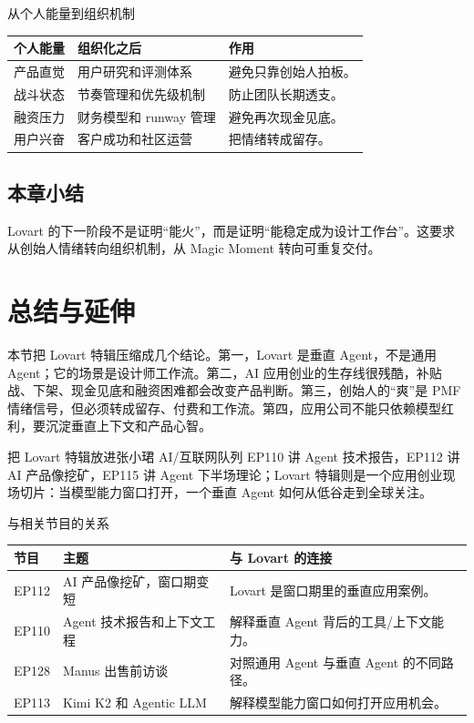 \documentclass[a4paper]{article}
\begin{document}
\begin{knowledgebox}{从个人能量到组织机制}
\begin{tabularx}{\textwidth}{p{}p{}X}
\toprule
个人能量 & 组织化之后 & 作用 \\
\midrule
产品直觉 & 用户研究和评测体系 & 避免只靠创始人拍板。 \\
战斗状态 & 节奏管理和优先级机制 & 防止团队长期透支。 \\
融资压力 & 财务模型和 runway 管理 & 避免再次现金见底。 \\
用户兴奋 & 客户成功和社区运营 & 把情绪转成留存。 \\
\bottomrule
\end{tabularx}
\end{knowledgebox}

\subsection{本章小结}

Lovart 的下一阶段不是证明“能火”，而是证明“能稳定成为设计工作台”。这要求从创始人情绪转向组织机制，从 Magic Moment 转向可重复交付。

\section{总结与延伸}

本节把 Lovart 特辑压缩成几个结论。第一，Lovart 是垂直 Agent，不是通用 Agent；它的场景是设计师工作流。第二，AI 应用创业的生存线很残酷，补贴战、下架、现金见底和融资困难都会改变产品判断。第三，创始人的“爽”是 PMF 情绪信号，但必须转成留存、付费和工作流。第四，应用公司不能只依赖模型红利，要沉淀垂直上下文和产品心智。

\begin{importantbox}{把 Lovart 特辑放进张小珺 AI/互联网队列}
EP110 讲 Agent 技术报告，EP112 讲 AI 产品像挖矿，EP115 讲 Agent 下半场理论；Lovart 特辑则是一个应用创业现场切片：当模型能力窗口打开，一个垂直 Agent 如何从低谷走到全球关注。
\end{importantbox}

\begin{knowledgebox}{与相关节目的关系}
\begin{tabularx}{\textwidth}{p{}p{}X}
\toprule
节目 & 主题 & 与 Lovart 的连接 \\
\midrule
EP112 & AI 产品像挖矿，窗口期变短 & Lovart 是窗口期里的垂直应用案例。 \\
EP110 & Agent 技术报告和上下文工程 & 解释垂直 Agent 背后的工具/上下文能力。 \\
EP128 & Manus 出售前访谈 & 对照通用 Agent 与垂直 Agent 的不同路径。 \\
EP113 & Kimi K2 和 Agentic LLM & 解释模型能力窗口如何打开应用机会。 \\
\bottomrule
\end{tabularx}
\end{knowledgebox}
\end{document}
